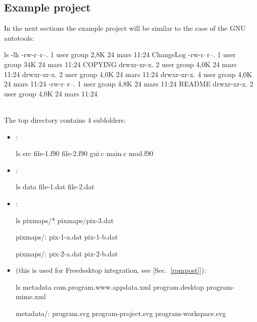 \subsection{Example project}

In the next sections the example project will be similar to the case of the GNU autotools: 
{\footnotesize{
\begin{script}
 ls -lh
-rw-r--r--. 1 user group 2,8K 24 mars  11:24 ChangeLog
-rw-r--r--. 1 user group  34K 24 mars  11:24 COPYING
drwxr-xr-x. 2 user group 4,0K 24 mars  11:24 
drwxr-xr-x. 2 user group 4,0K 24 mars  11:24 
drwxr-xr-x. 4 user group 4,0K 24 mars  11:24 
-rw-r--r--. 1 user group 4,8K 24 mars  11:24 README
drwxr-xr-x. 2 user group 4,0K 24 mars  11:24 
\end{script}
}}
\vspace{-0.25cm}
\\
\noindent The top directory contains 4 subfolders:
\begin{itemize}
\item {}:
{\footnotesize{
\begin{scripti}
 ls src
file-1.f90    file-2.f90    gui.c    main.c    mod.f90
\end{scripti}
}}
\vspace{-0.75cm} \item {}:
{\footnotesize{
\begin{scripti}
 ls data
file-1.dat    file-2.dat
\end{scripti}
}}
\vspace{-0.75cm}
\item {}:
{\footnotesize{
\begin{scripti}
 ls pixmaps/*
pixmaps/pix-3.dat

pixmaps/:
pix-1-a.dat    pix-1-b.dat

pixmaps/:
pix-2-a.dat    pix-2-b.dat
\end{scripti}
}}
\vspace{-0.75cm} \item {} (this is used for Freedesktop integration, see [Sec.~\ref{rpmpost}]):
{\footnotesize{
\begin{scripti}
 ls metadata
com.program.www.appdata.xml    program.desktop    program-mime.xml

metadata/:
program.svg    program-project.svg    program-workspace.svg
\end{scripti}
}}
\end{itemize}

